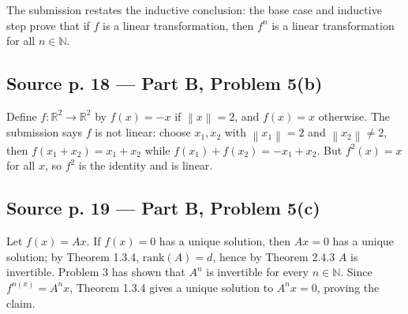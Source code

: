 The submission restates the inductive conclusion: the base case and inductive step prove that if \(f\) is a linear transformation, then \(f^{n}\) is a linear transformation for all \(n \in \mathbb{N}\).

\subsection{Source p. 18 --- Part B, Problem 5(b)}

Define \(f:\mathbb{R}^{2}\rightarrow\mathbb{R}^{2}\) by \(f(x) = - x\) if \(\left\| x \right\| = 2\), and \(f(x) = x\) otherwise. The submission says \(f\) is not linear: choose \(x_{1},x_{2}\) with \(\left\| x_{1} \right\| = 2\) and \(\left\| x_{2} \right\| \neq 2\), then \(f\left( {x_{1} + x_{2}} \right) = x_{1} + x_{2}\) while \(f\left( x_{1} \right) + f\left( x_{2} \right) = - x_{1} + x_{2}\). But \(f^{2}(x) = x\) for all \(x\), so \(f^{2}\) is the identity and is linear.

\subsection{Source p. 19 --- Part B, Problem 5(c)}

Let \(f(x) = Ax\). If \(f(x) = 0\) has a unique solution, then \(Ax = 0\) has a unique solution; by Theorem 1.3.4, \(\text{rank}(A) = d\), hence by Theorem 2.4.3 \(A\) is invertible. Problem 3 has shown that \(A^{n}\) is invertible for every \(n \in \mathbb{N}\). Since \(f^{n{(x)}} = A^{n}x\), Theorem 1.3.4 gives a unique solution to \(A^{n}x = 0\), proving the claim.
